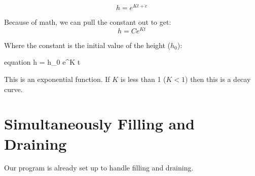 \documentclass[11pt,fleqn]{book}
\begin{document}
	\begin{equation}
		h = e^{K t + c}
	\end{equation}
	
	Because of math, we can pull the constant out to get:
	\begin{equation}
		h = Ce^{K t}
	\end{equation}
	
	Where the constant is the initial value of the height ($h_0$):
	\begin{empheq}[]{equation}
		\label{analyticalDraining}
		h = h_0 \cdot e^{K t}
	\end{empheq}
	
	This is an exponential function. If $K$ is less than 1 ($K<1$) then this is a decay curve.
	
	
\chapter{Simultaneously Filling and Draining}

Our program is already set up to handle filling and draining.


 
\end{document}
